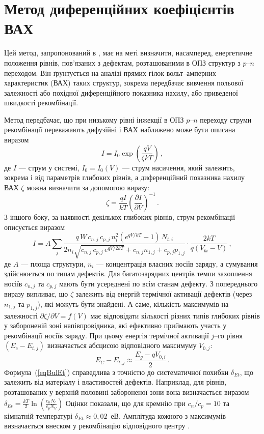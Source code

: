 \chapter{Метод диференційних коефіцієнтів ВАХ}\label{chapVAH}

Цей метод, запропонований в \cite{Bulyar}, має на меті визначити, насамперед,
енергетичне положення рівнів, пов'язаних з дефектам, розташованими
в ОПЗ структур з $p$--$n$ переходом.
Він ґрунтується на аналізі прямих гілок вольт--амперних характеристик (ВАХ)
таких структур, зокрема передбачає
вивчення польової залежності або похідної диференційного показника нахилу,
або приведеної швидкості рекомбінації.

Метод передбачає, що при низькому рівні інжекції в ОПЗ $p$--$n$ переходу
струми рекомбінації переважають дифузійні і ВАХ наближено може бути описана
виразом
\begin{equation}
I=I_0\exp\left(\frac{qV}{\zeta kT}\right)\,,
\end{equation}
де
$I$ --- струм у системі,
$I_0=I_0(V)$ --- струм насичення, який залежить, зокрема і від параметрів глибоких рівнів,
а диференційний показника нахилу ВАХ $\zeta$ можна визначити за допомогою виразу:
\begin{equation}\label{BetaVAX}
  \zeta=\frac{qI}{kT}\left(\frac{\partial I}{\partial V}\right)^{-1}\,.
\end{equation}
З іншого боку, за наявності декількох глибоких рівнів, струм рекомбінації описується виразом
\begin{equation}
  I=A\sum_j\frac{q\,W\,c_{n,j}\,c_{p,j}\,n_i^2\left(e^{qV/kT}-1\right)\,N_{t,i}}
   {2 n_i\sqrt{c_{n,j}\,c_{p,j}\,e^{qV/2kT}}+c_{n,j}n_{1,j}+c_{p,j}p_{1,j}}\cdot
   \frac{2kT}{q(V_{bi}-V)}\,,
\end{equation}
де
$A$ --- площа структури,
$n_i$ --- концентрація власних носіїв заряду,
а сумування здійснюється по типам дефектів.
Для багатозарядних центрів темпи захоплення носіїв $c_{n,j}$ та $c_{p,j}$ мають бути
усереднені по всім станам дефекту.
З попереднього виразу випливає, що $\zeta$ залежить від
енергій термічної активації дефектів (через $n_{1,j}$ та $p_{1,j}$),
які можуть бути знайдені.
А саме, кількість максимумів на залежності $\partial \zeta/ \partial V = f (V)$ має
відповідати кількості різних типів глибоких
рівнів у забороненій зоні напівпровідника,
які ефективно приймають участь у рекомбінації носіїв заряду.
При цьому енергія термічної активації $j$--го рівня $(E_c-E_{t,j})$ визначається абсцисою
відповідного максимуму $V_{0,j}$:
\begin{equation}\label{eqBulEt}
  E_C-E_{t,j}\approx \frac{E_g-q V_{0,i}}{2}\,.
\end{equation}
Формула~(\ref{eqBulEt}) справедлива з точністю до систематичної похибки $\delta_{Et}$,
що залежить від матеріалу і властивостей дефектів.
Наприклад, для рівнів, розташованих у верхній половині забороненої зони вона визначається виразом
$\delta_{Et}=\frac{kT}{2}\ln\left(\frac{c_n N_c}{c_p N_V}\right)$
Оцінки показали, що для кремнію при $c_n/c_p=10$ та кімнатній температурі $\delta_{Et}\approx0,02$~еВ.
Амплітуда кожного з максимумів визначається внеском у рекомбінацію відповідного центру \cite{Bulyar}.

